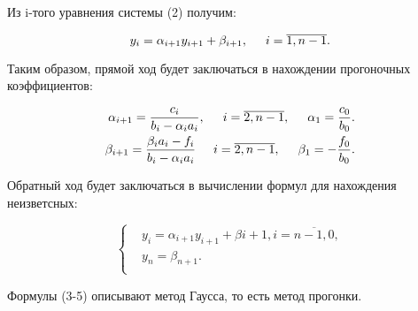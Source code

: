 \documentclass[a4paper,12pt]{article}
\begin{document}
Из i-того уравнения системы (2) получим:

\begin{equation*}
  y_i = \alpha_{i+1} y_{i+1} + \beta_{i+1}, \hspace{0.5cm} i = \overline{1, n- 1}.
\end{equation*}

Таким образом, прямой ход будет заключаться в нахождении прогоночных коэффициентов:

\begin{align}
  \alpha_{i + 1} = \frac{c_i}{b_i - \alpha_i a_i}, \hspace{0.5cm} i = \overline{2, n - 1}, \hspace{0.5cm} \alpha_1 = \frac{c_0}{b_0}. \\
  \beta_{i + 1} = \frac{\beta_i a_i - f_i}{b_i - \alpha_i a_i}  \hspace{0.5cm} i = \overline{2, n - 1}, \hspace{0.5cm} \beta_1 = -\frac{f_0}{b_0}. 
\end{align}

Обратный ход будет заключаться в вычислении формул для нахождения неизветсных:

\begin{equation}
  \begin{cases}
    &y_i = \alpha_{i+1} y_{i+1} + \beta{i+1}, i = \overline{n - 1, 0},\\
    &y_n = \beta_{n+1}.\\ 
  \end{cases}
\end{equation}
\newpage

Формулы (3-5) описывают метод Гаусса, то есть метод прогонки.
\end{document}
